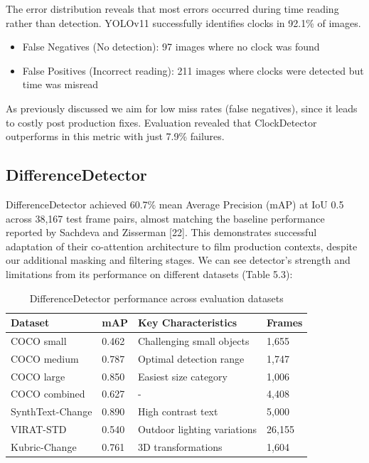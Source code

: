 The error distribution reveals that most errors occurred during time reading rather than detection. YOLOv11 successfully identifies clocks in 92.1\% of images. 
\begin{itemize}
\item False Negatives (No detection): 97 images where no clock was found
\item False Positives (Incorrect reading): 211 images where clocks were detected but time was misread
\end{itemize}

As previously discussed we aim for low miss rates (false negatives), since it leads to costly post production fixes. Evaluation revealed that ClockDetector outperforms in this metric with just 7.9\% failures.

\subsection{DifferenceDetector}
DifferenceDetector achieved 60.7\% mean Average Precision (mAP) at IoU 0.5 across 38,167 test frame pairs, almost matching the baseline performance reported by Sachdeva and Zisserman [22]. This demonstrates successful adaptation of their co-attention architecture to film production contexts, despite our additional masking and filtering stages. We can see detector's strength and limitations from its performance on different datasets (Table 5.3):

\begin{table}[h]
\centering
\caption{DifferenceDetector performance across evaluation datasets}
\label{tab:difference-performance}
\begin{tabular}{llll}
\toprule
\textbf{Dataset} & \textbf{mAP} & \textbf{Key Characteristics} & \textbf{Frames} \\
\midrule
COCO small & 0.462 & Challenging small objects & 1,655 \\
COCO medium & 0.787 & Optimal detection range & 1,747 \\
COCO large & 0.850 & Easiest size category & 1,006 \\
COCO combined & 0.627 & - & 4,408 \\
SynthText-Change & 0.890 & High contrast text & 5,000 \\
VIRAT-STD & 0.540 & Outdoor lighting variations & 26,155 \\
Kubric-Change & 0.761 & 3D transformations & 1,604 \\
\bottomrule
\end{tabular}
\end{table}

